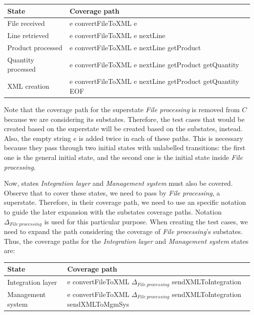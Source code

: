 \begin{center}
\begin{tabular}{| l | l|}

\hline

State & Coverage path \\ \hline

File received & e convertFileToXML e \\ \hline

Line retrieved & e convertFileToXML e nextLine\\ \hline

Product processed & e convertFileToXML e nextLine getProduct\\ \hline

Quantity processed & e convertFileToXML e nextLine getProduct getQuantity\\ \hline

XML creation & e convertFileToXML e nextLine getProduct getQuantity EOF\\ 

\hline
\end{tabular}
\end{center}

Note that the coverage path for the superstate \textit{File processing} is removed from $C$ because we are considering its substates. Therefore, the test cases that would be created based on the superstate will be created based on the substates, instead. Also, the empty string $e$ is added twice in each of these paths. This is necessary because they pass through two initial states with unlabelled transitions: the first one is the general initial state, and the second one is the initial state inside \textit{File processing}.

Now, states \textit{Integration layer} and \textit{Management system} must also be covered. Observe that to cover these states, we need to pass by \textit{File processing}, a superstate. Therefore, in their coverage path, we need to use an specific notation to guide the later expansion with the substates coverage paths. Notation $\Delta_{File\ processing}$ is used for this particular purpose. When creating the test cases, we need to expand the path considering the coverage of \textit{File processing}'s substates. Thus, the coverage paths for the \textit{Integration layer} and \textit{Management system} states are:

\begin{center}
\begin{tabular}{| l | p{10cm}|}

\hline

State & Coverage path \\ \hline

Integration layer & e convertFileToXML $\Delta_{File\ processing}$ sendXMLToIntegration \\ \hline

Management system & e convertFileToXML $\Delta_{File\ processing}$ sendXMLToIntegration sendXMLToMgmSys\\

\hline
\end{tabular}
\end{center}

